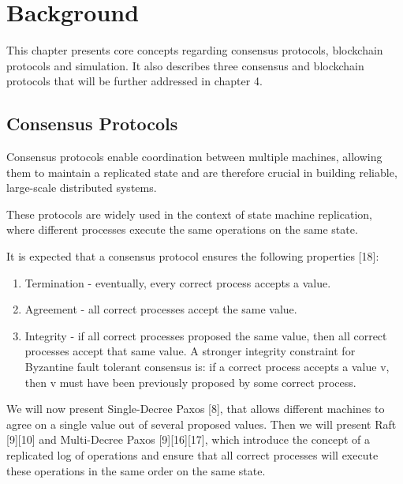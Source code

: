 

\chapter{Background}
\label{cha:background}

\glsresetall

This chapter presents core concepts regarding consensus protocols, blockchain protocols and simulation. It also describes three consensus and blockchain protocols that will be further addressed in chapter 4.


\section{Consensus Protocols}
\label{sec:consensus_protocols}

Consensus protocols enable coordination between multiple machines, allowing them to maintain a replicated state and are therefore crucial in building reliable, large-scale distributed systems.

These protocols are widely used in the context of state machine replication, where different processes execute the same operations on the same state.

It is expected that a consensus protocol ensures the following properties [18]:

\begin{enumerate}
  \item Termination - eventually, every correct process accepts a value.
  \item Agreement - all correct processes accept the same value.
  \item Integrity - if all correct processes proposed the same value, then all correct processes accept that same value. A stronger integrity constraint for Byzantine fault tolerant consensus is: if a correct process accepts a value v, then v must have been previously proposed by some correct process.
\end{enumerate}

We will now present Single-Decree Paxos [8], that allows different machines to agree on a single value out of several proposed values. Then we will present  Raft [9][10] and Multi-Decree Paxos [9][16][17], which introduce the concept of a replicated log of operations and ensure that all correct processes will execute these operations in the same order on the same state.


